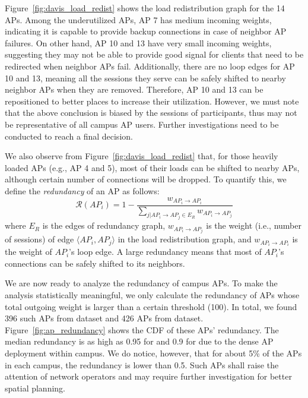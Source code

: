 Figure~\ref{fig:davis_load_redist} shows the load redistribution graph for the
14 APs. Among the underutilized APs, AP 7 has medium 
incoming weights, indicating it is capable to provide backup connections
in case of neighbor AP failures. On other hand, AP 10 and 13 have very small incoming
weights, suggesting they may not be able to provide good signal for clients
that need to be redirected when neighbor APs fail. Additionally, there are no loop edges for
AP 10 and 13, meaning all the \wifi{} sessions they serve can be safely shifted to
nearby neighbor APs when they are removed. Therefore, AP 10 and 13 can be
repositioned to better places to increase their utilization. However, we must
note that the above conclusion is biased by the \wifi{} sessions of \PhoneLab{}
participants, thus may not be representative of all campus AP users. Further
investigations need to be conducted to reach a final decision.

We also observe from Figure~\ref{fig:davis_load_redist} that, for those heavily
loaded APs (e.g., AP 4 and 5), most of their loads can be shifted to nearby APs,
although certain number of connections will be dropped. To quantify this, we define the
\textit{redundancy} of an AP as follows:%
\begin{equation}
  \mathcal{R}(AP_i) = 1 - \frac{w_{AP_i \rightarrow AP_i}}{\sum_{j|AP_i \rightarrow
    AP_j \in E_R} w_{AP_i \rightarrow AP_j}}
\end{equation}%
where $E_R$ is the edges of redundancy graph, $w_{AP_i \rightarrow AP_j}$ is the
weight (i.e., number of sessions) of edge $\langle AP_i, AP_j\rangle$ in the
load redistribution graph, and $w_{AP_i \rightarrow AP_i}$ is the weight of
$AP_i$'s loop edge. A large redundancy means that most of $AP_i$'s connections
can be safely shifted to its neighbors.

We are now ready to analyze the redundancy of campus APs. To make the analysis
statistically meaningful, we only calculate the redundancy of APs whose total
outgoing weight is larger than a certain threshold (100). In total, we found
396 such APs from \ubscan{} dataset and 426 APs from \ndscan{} dataset.
Figure~\ref{fig:ap_redundancy} shows the CDF of these APs' redundancy. The
median redundancy is as high as 0.95 for \ub{} and 0.9 for \nd{} due to the dense AP
deployment within campus. We do notice, however, that for about 5\% of the APs in
each campus, the redundancy is lower than 0.5. Such APs shall raise the attention of network
operators and may require further investigation for better spatial planning.


